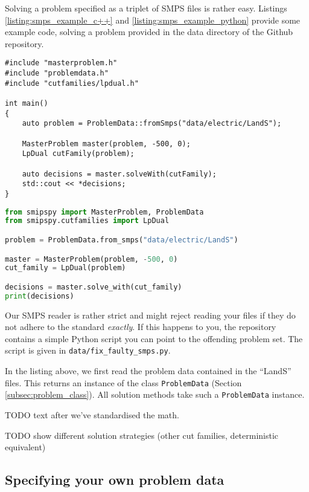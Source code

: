 \documentclass[12pt, english]{article}
\begin{document}
Solving a problem specified as a triplet of SMPS files is rather easy. Listings \ref{listing:smps_example_c++} and \ref{listing:smps_example_python} provide some example code, solving a problem provided in the data directory of the Github repository.
\begin{lstlisting}[caption={Solving an SMPS problem in C++.},
                   label={listing:smps_example_c++}]
#include "masterproblem.h"
#include "problemdata.h"
#include "cutfamilies/lpdual.h"

int main()
{
	auto problem = ProblemData::fromSmps("data/electric/LandS");
	
	MasterProblem master(problem, -500, 0);
	LpDual cutFamily(problem);
	
	auto decisions = master.solveWith(cutFamily);
	std::cout << *decisions;
}
\end{lstlisting}
\begin{lstlisting}[caption={Solving an SMPS problem in Python.},
                   label={listing:smps_example_python},
                   language={Python}]
from smipspy import MasterProblem, ProblemData
from smipspy.cutfamilies import LpDual

problem = ProblemData.from_smps("data/electric/LandS")

master = MasterProblem(problem, -500, 0)
cut_family = LpDual(problem)

decisions = master.solve_with(cut_family)
print(decisions)
\end{lstlisting}
Our SMPS reader is rather strict and might reject reading your files if they do not adhere to the standard \textit{exactly}. If this happens to you, the repository contains a simple Python script you can point to the offending problem set. The script is given in \texttt{data/fix\_faulty\_smps.py}.

In the listing above, we first read the problem data contained in the ``LandS'' files. This returns an instance of the class \texttt{ProblemData} (Section \ref{subsec:problem_class}). All solution methods take such a \texttt{ProblemData} instance.

TODO text after we've standardised the math.

TODO show different solution strategies (other cut families, deterministic equivalent)

\subsection{Specifying your own problem data}
\label{subsec:own_data_example}
\end{document}
